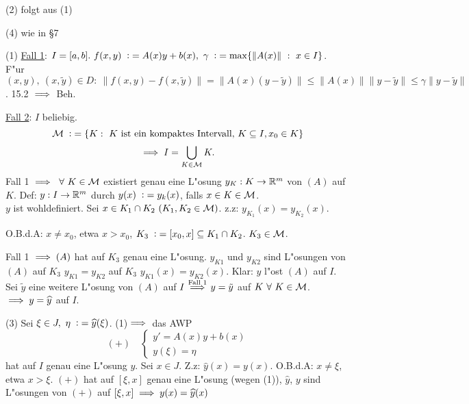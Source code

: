 \documentclass{article}
\begin{document}
\begin{beweis}[von 16.1]
\begin{liste}
\item[(2)] folgt aus (1)
\item[(4)] wie in §7
\item[(1)] \underline{Fall 1}: $I=[a,b].\ f(x,y)\da A(x)y+b(x),\ \gamma\da \max\{\|A(x)\|\ :\ x\in I\}$.\\
F"ur $(x,y),\ (x,\tilde{y})\in D:\ \|f(x,y)-f(x,\tilde{y})\|=\|A(x)(y-\tilde{y})\|\le\|A(x)\|\|y-\tilde{y}\|\le\gamma\|y-\tilde{y}\|$.
15.2 $\implies$ Beh.

\underline{Fall 2}: $I$ beliebig.
\[
	\MM\da \{K:\ K\text{ ist ein kompaktes Intervall, }K\subseteq I, x_0\in K\}
\]
\[
	\implies I=\bigcup_{K\in\mathcal{M}}K.
\]
Fall 1 $\implies\ \forall\ K\in\mathcal{M}$ existiert genau eine L"osung $y_K:K\to\mathbb{R}^m$ von $(A)$ auf $K$. Def: $y:I\to\mathbb{R}^m$ durch $y(x)\da y_k(x)$, falls
$x\in K\in\mathcal{M}$.\\
$y$ ist wohldefiniert. Sei $x\in K_1\cap K_2\ (K_1, K_2\in\MM)$. z.z: $y_{K_1}(x)=y_{K_2}(x)$.

O.B.d.A: $x\ne x_0$, etwa $x>x_0$, $K_3\da [x_0,x]\subseteq K_1\cap K_2$.
$K_3\in\mathcal{M}$.

Fall 1 $\implies (A)$ hat auf $K_3$ genau eine L"osung. $y_{K1}$ und $y_{K2}$ sind L"osungen von $(A)$ auf $K_3$ \folgt $y_{K1}=y_{K2}$ auf $K_3$
\folgt $y_{K1}(x)=y_{K2}(x)$. Klar: $y$ l"ost $(A)$ auf $I$. Sei $\tilde{y}$ eine weitere L"osung von $(A)$ auf $I \overset{\text{Fall 1}}{\implies}y=\tilde{y}$ auf $K\ \forall\ K\in\MM$. $\implies y=\widehat{y}$ auf $I$.
\item[(3)]Sei $\xi\in J,\ \eta\da \widehat{y}(\xi)$. (1)$\implies$ das AWP 
\[
	(+)\quad\begin{cases}
		y'=A(x)y+b(x)\\
		y(\xi)=\eta
	\end{cases}
\]
hat auf $I$ genau eine L"osung $y$. Sei $x\in J$. Z.z: $\widehat{y}(x)=y(x)$. O.B.d.A: $x\ne\xi$, etwa $x>\xi$. $(+)$ hat auf $[\xi,x]$ genau eine L"osung (wegen (1)), $\widehat{y}$, $y$ sind L"osungen von $(+)$ auf $[\xi,x]\implies y(x)=\widehat{y}(x)$
\end{liste}
\end{beweis}
\end{document}
